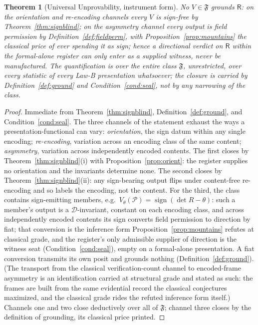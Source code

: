 \documentclass[twocolumn,10pt]{article}
\theoremstyle{plain}
\newtheorem{theorem}{Theorem}[section]
\theoremstyle{definition}
\newcommand{\R}{\mathsf{R}}
\newcommand{\Fr}{\mathfrak{F}}
\begin{document}
\begin{theorem}[Universal Unprovability, instrument form]\label{thm:uut}
No $V\in\Fr$ grounds $\R$: on the orientation and re-encoding channels every $V$ is sign-free by Theorem~\ref{thm:signblind}; on the asymmetry channel every output is field permission by Definition~\ref{def:fieldperm}, with Proposition~\ref{prop:mountains} the classical price of ever spending it as sign; hence a directional verdict on $\R$ within the formal-alone register can only enter as a supplied witness, never be manufactured. The quantification is over the entire class $\Fr$, unrestricted, over every statistic of every Law-B presentation whatsoever; the closure is carried by Definition~\ref{def:ground} and Condition~\ref{cond:seal}, not by any narrowing of the class.
\end{theorem}
\begin{proof}
Immediate from Theorem~\ref{thm:signblind}, Definition~\ref{def:ground}, and Condition~\ref{cond:seal}. The three channels of the statement exhaust the ways a presentation-functional can vary: \emph{orientation}, the sign datum within any single encoding; \emph{re-encoding}, variation across an encoding class of the same content; \emph{asymmetry}, variation across independently encoded contents. The first closes by Theorem~\ref{thm:signblind}(i) with Proposition~\ref{prop:orient}: the register supplies no orientation and the invariants determine none. The second closes by Theorem~\ref{thm:signblind}(ii): any sign-bearing output flips under content-free re-encoding and so labels the encoding, not the content. For the third, the class contains sign-emitting members, e.g.\ $V_\theta(\mathcal P)=\operatorname{sign}(\det R-\theta)$: such a member's output is a $\mathcal D$-invariant, constant on each encoding class, and across independently encoded contents its sign converts field permission to direction by fiat; that conversion is the inference form Proposition~\ref{prop:mountains} refutes at classical grade, and the register's only admissible supplier of direction is the witness seat (Condition~\ref{cond:seal}), empty on a formal-alone presentation. A fiat conversion transmits its own posit and grounds nothing (Definition~\ref{def:ground}). (The transport from the classical verification-count channel to encoded-frame asymmetry is an identification carried at structural grade and stated as such: the frames are built from the same evidential record the classical conjectures maximized, and the classical grade rides the refuted inference form itself.) Channels one and two close deductively over all of $\Fr$; channel three closes by the definition of grounding, its classical price printed.
\end{proof}
\end{document}

